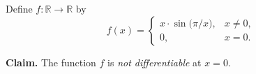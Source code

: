 \begin{problem}
Define $f : \mathbb{R} \to \mathbb{R}$ by
\[
  f(x) =
  \begin{cases}
    x \cdot \sin\!\bigl(\pi / x\bigr), & x \neq 0, \\
    0, & x = 0.
  \end{cases}
\]

\textbf{Claim.} The function $f$ is \emph{not differentiable} at
$x = 0$.
\end{problem}
